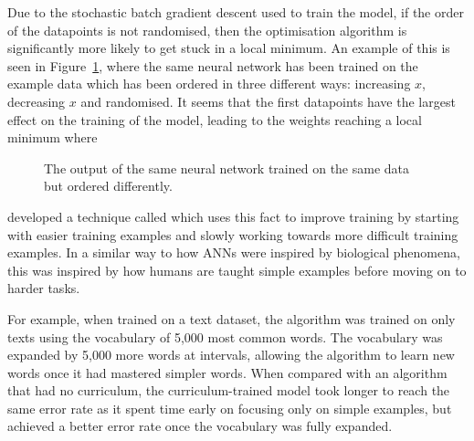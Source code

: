 Due to the stochastic batch gradient descent used to train the model, if the order of the datapoints is not randomised, then the optimisation algorithm is significantly more likely to get stuck in a local minimum.
An example of this is seen in Figure~\ref{fig:compare-order}, where the same neural network has been trained on the example data which has been ordered in three different ways: increasing \(x\), decreasing \(x\) and randomised.
It seems that the first datapoints have the largest effect on the training of the model, leading to the weights reaching a local minimum where 

\begin{figure}[htbp]
	\centering
	
	\caption{The output of the same neural network trained on the same data but ordered differently.}
	\label{fig:compare-order}
\end{figure}

\textcite{bengio2009} developed a technique called  which uses this fact to improve training by starting with easier training examples and slowly working towards more difficult training examples.
In a similar way to how \acp{ANN} were inspired by biological phenomena, this was inspired by how humans are taught simple examples before moving on to harder tasks.

For example, when trained on a text dataset, the algorithm was trained on only texts using the vocabulary of 5,000 most common words.
The vocabulary was expanded by 5,000 more words at intervals, allowing the algorithm to learn new words once it had mastered simpler words.
When compared with an algorithm that had no curriculum, the curriculum-trained model took longer to reach the same error rate as it spent time early on focusing only on simple examples, but achieved a better error rate once the vocabulary was fully expanded.
